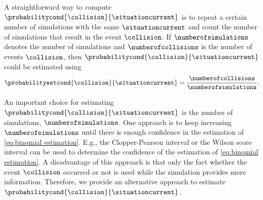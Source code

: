 A straightforward way to compute $\probabilitycond{\collision}{\situationcurrent}$ is to repeat a certain number of simulations with the same $\situationcurrent$ and count the number of simulations that result in the event $\collision$.
If $\numberofsimulations$ denotes the number of simulations and $\numberofcollisions$ is the number of events $\collision$, then $\probabilitycond{\collision}{\situationcurrent}$ could be estimated using
\begin{equation}
	\label{eq:binomial estimation}
	\probabilityestcond{\collision}{\situationcurrent}
	= \frac{\numberofcollisions}{\numberofsimulations}.
\end{equation}

An important choice for estimating $\probabilitycond{\collision}{\situationcurrent}$ is the number of simulations, $\numberofsimulations$.
One approach is to keep increasing $\numberofsimulations$ until there is enough confidence in the estimation of \cref{eq:binomial estimation}.
E.g., the Clopper-Pearson interval \autocite{clopper1934use} or the Wilson score interval \autocite{wilson1927probable} can be used to determine the confidence of the estimation of \cref{eq:binomial estimation}.
A disadvantage of this approach is that only the fact whether the event $\collision$ occurred or not is used while the simulation provides more information. 
Therefore, we provide an alternative approach to estimate $\probabilitycond{\collision}{\situationcurrent}$.

